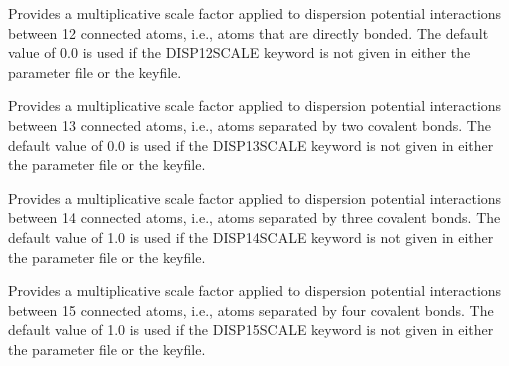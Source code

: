 \documentclass[letterpaper,11pt,english]{sphinxmanual}
\begin{document}
\ignorespaces {}\label{\detokenize{text/keywords:key-disp-12-scale}}\begin{description}
\sphinxAtStartPar
Provides a multiplicative scale factor applied to dispersion potential interactions between 1\sphinxhyphen{}2 connected atoms, i.e., atoms that are directly bonded. The default value of 0.0 is used if the DISP\sphinxhyphen{}12\sphinxhyphen{}SCALE keyword is not given in either the parameter file or the keyfile.

\end{description}

\ignorespaces {}\label{\detokenize{text/keywords:key-disp-13-scale}}\begin{description}
\sphinxAtStartPar
Provides a multiplicative scale factor applied to dispersion potential interactions between 1\sphinxhyphen{}3 connected atoms, i.e., atoms separated by two covalent bonds. The default value of 0.0 is used if the DISP\sphinxhyphen{}13\sphinxhyphen{}SCALE keyword is not given in either the parameter file or the keyfile.

\end{description}

\ignorespaces {}\label{\detokenize{text/keywords:key-disp-14-scale}}\begin{description}
\sphinxAtStartPar
Provides a multiplicative scale factor applied to dispersion potential interactions between 1\sphinxhyphen{}4 connected atoms, i.e., atoms separated by three covalent bonds. The default value of 1.0 is used if the DISP\sphinxhyphen{}14\sphinxhyphen{}SCALE keyword is not given in either the parameter file or the keyfile.

\end{description}

\ignorespaces {}\label{\detokenize{text/keywords:key-disp-15-scale}}\begin{description}
\sphinxAtStartPar
Provides a multiplicative scale factor applied to dispersion potential interactions between 1\sphinxhyphen{}5 connected atoms, i.e., atoms separated by four covalent bonds. The default value of 1.0 is used if the DISP\sphinxhyphen{}15\sphinxhyphen{}SCALE keyword is not given in either the parameter file or the keyfile.

\end{description}
\end{document}

